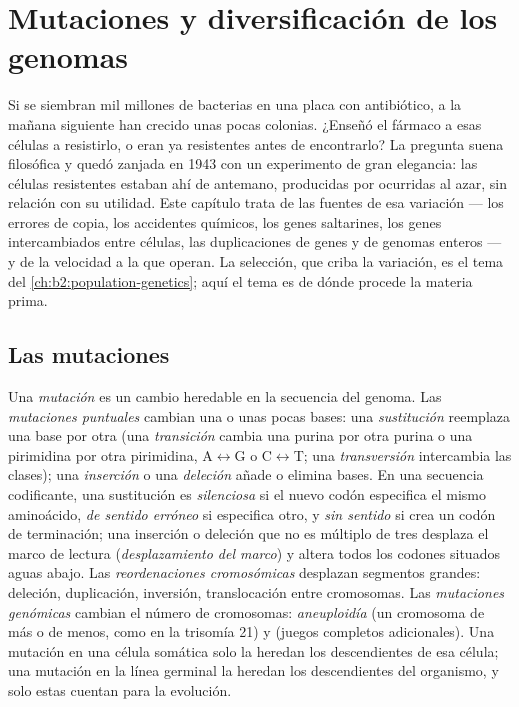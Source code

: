 \chapter{Mutaciones y diversificación de los genomas}\label{ch:b2:genome-diversification}

Si se siembran mil millones de bacterias en una placa con antibiótico, a
la mañana siguiente han crecido unas pocas colonias. ¿Enseñó el fármaco a
esas células a resistirlo, o eran ya resistentes antes de encontrarlo? La
pregunta suena filosófica y quedó zanjada en 1943 con un experimento de
gran elegancia: las células resistentes estaban ahí de antemano,
producidas por  ocurridas al azar, sin relación con su
utilidad. Este capítulo trata de las fuentes de esa variación --- los
errores de copia, los accidentes químicos, los genes saltarines, los genes
intercambiados entre células, las duplicaciones de genes y de genomas
enteros --- y de la velocidad a la que operan. La selección, que criba la
variación, es el tema del \cref{ch:b2:population-genetics}; aquí el tema
es de dónde procede la materia prima.

\section{Las mutaciones}

\begin{definition}\label{def:b2:genome-diversification:mutation}
Una \emph{mutación} es un cambio heredable en la secuencia del genoma.
Las \emph{mutaciones puntuales} cambian una o unas pocas bases: una
\emph{sustitución} reemplaza una base por otra (una \emph{transición}
cambia una purina por otra purina o una pirimidina por otra pirimidina,
A$\leftrightarrow$G o C$\leftrightarrow$T; una \emph{transversión}
intercambia las clases); una \emph{inserción} o una \emph{deleción}
añade o elimina bases. En una secuencia codificante, una sustitución es
\emph{silenciosa} si el nuevo codón especifica el mismo aminoácido,
\emph{de sentido erróneo} si especifica otro, y \emph{sin sentido} si
crea un codón de terminación; una inserción o deleción que no es múltiplo
de tres desplaza el marco de lectura (\emph{desplazamiento del marco}) y
altera todos los codones situados aguas abajo. Las
\emph{reordenaciones cromosómicas} desplazan segmentos grandes: deleción,
duplicación, inversión, translocación entre cromosomas. Las
\emph{mutaciones genómicas} cambian el número de cromosomas:
\emph{aneuploidía} (un cromosoma de más o de menos, como en la trisomía
21) y \emph{} (juegos completos adicionales). Una mutación en
una célula somática solo la heredan los descendientes de esa célula; una
mutación en la línea germinal la heredan los descendientes del
organismo, y solo estas cuentan para la evolución.
\end{definition}

